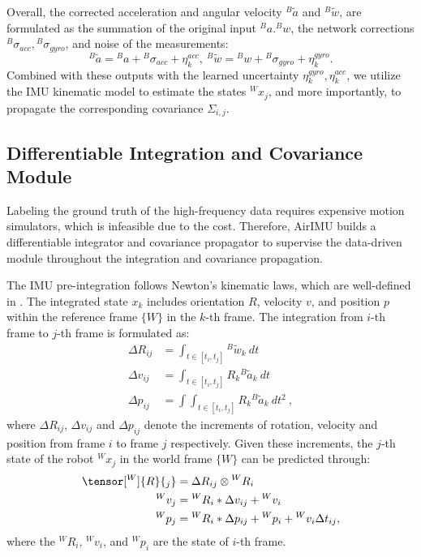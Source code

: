 Overall, the corrected acceleration and angular velocity ${}^B{\tilde a}$ and ${}^B{\tilde w}$, are formulated as the summation of the original input ${}^Ba. {}^Bw$, the network corrections ${}^B{\sigma_{acc}}, {}^B{\sigma_{gyro}}$, and noise of the measurements:
\begin{equation}
    {}^B{\tilde a} = {}^Ba + {}^B{\sigma_{acc}} + \eta^{acc}_k,\  {}^B{\tilde w} = {}^Bw + {}^B{\sigma_{gyro}}  + \eta^{gyro}_k.
\end{equation}
Combined with these outputs with the learned uncertainty $\eta^{gyro}_k, \eta^{acc}_k$, we utilize the IMU kinematic model to estimate the states ${}^Wx_j$, and more importantly, to propagate the corresponding covariance $\Sigma_{i,j}$.

\subsection{Differentiable Integration and Covariance Module}
\label{Model: Integrator}
Labeling the ground truth of the high-frequency data requires expensive motion simulators, which is infeasible due to the cost.
Therefore, AirIMU builds a differentiable integrator and covariance propagator to supervise the data-driven module throughout the integration and covariance propagation. 

The IMU pre-integration follows Newton's kinematic laws, which are well-defined in \cite{forster2015imu}. 
The integrated state $x_k$ includes orientation $R$, velocity $v$, and position $p$ within the reference frame $\{W\}$ in the $k$-th frame.
The integration from $i$-th frame to $j$-th frame is formulated as:
\begin{equation}
    \begin{split}
    \label{formula: 2.integrate}
        {\Delta}R_{ij} &= \int_{t \in [t_i, t_j]} {}^B \tilde w_k \ dt \\
        {\Delta}v_{ij} &= \int_{t \in [t_i, t_j]} R_{k} {}^B \tilde a_k \ dt \\
        {\Delta}p_{ij} &= \int\int_{t \in [t_i, t_j]} R_{k} {}^B \tilde a_k\ dt^2\ ,
    \end{split}
\end{equation}
where ${\Delta}R_{ij}$, ${\Delta}v_{ij}$ and ${\Delta}p_{ij}$ denote the increments of rotation, velocity and position from frame $i$ to frame $j$ respectively.
Given these increments, the $j$-th state of the robot ${}^Wx_j$ in the world frame $\{W\}$ can be predicted through:
\begin{equation}
    \begin{split}
    \label{formula: 3.predict}
        \tensor[^W]{R}{_j} &= {\Delta}R_{ij} \otimes {}^WR_i \\
        {}^Wv_j &= {}^WR_i * {\Delta}v_{ij}   + {}^Wv_i\\
        {}^Wp_j &= {}^WR_i * {\Delta}p_{ij}   + {}^Wp_i + {}^Wv_i \Delta t_{ij},
    \end{split}
\end{equation}
where the ${}^WR_i$, ${}^Wv_i$, and ${}^Wp_i$ are the state of $i$-th frame.

